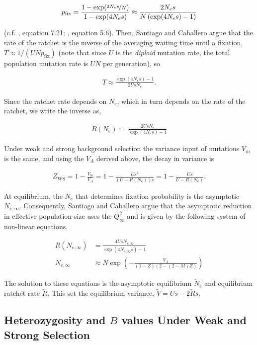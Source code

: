 \documentclass[11pt]{article}
\begin{document}
\begin{align}
  p_\text{fix} = \frac{1-\exp(\nicefrac{2 N_e s}{N})}{1-\exp(4 N_e s)} \approx
  \frac{2 N_e s}{N \left(\exp(4 N_e s)-1\right)}
\end{align}

(c.f. \cite{Durrett2008-ql}, equation 7.21; \cite{Kimura1957-rk}, equation
5.6). Then, Santiago and Caballero argue that the rate of the ratchet is the
inverse of the averaging waiting time until a fixation, $T \approx 1/(UN
p_\text{fix})$ (note that since $U$ is the \emph{diploid} mutation rate, the
total population mutation rate is $UN$ per generation), so

\begin{align}
  T \approx \frac{\exp(4 N_e s)-1}{2 U s N_e}.
\end{align}

Since the ratchet rate depends on $N_e$, which in turn depends on the rate of
the ratchet, we write the inverse as,

\begin{align}
  R(N_e) := \frac{2 U s N_e}{\exp(4 N_e s)-1}
\end{align}

Under weak and strong background selection the variance input of mutations
$V_m$ is the same, and using the $V_A$ derived above, the decay in variance is

\begin{align}
  Z_\text{WS} = 1 - \frac{V_m}{V_A} = 1 - \frac{Us^2}{(U-R(N_e))s} = 1 - \frac{Us}{U-R(N_e)}.
\end{align}

At equilibrium, the $N_e$ that determines fixation probability is the
asymptotic $N_{e,\infty}$. Consequently, Santiago and Caballero argue that the
asymptotic reduction in effective population size uses the $Q_\infty^2$ and is
given by the following system of non-linear equations,

\begin{align}
  R(N_{e,\infty}) &= \frac{4 U s N_{e,\infty}}{\exp(4 N_{e,\infty} s)-1}\\
  N_{e,\infty} &\approx N \exp\left(-\frac{V_A}{(1-Z) (2-(2-M) Z)} \right)
\end{align}

The solution to these equations is the asymptotic equilibrium $\widetilde{N}_e$ and
equilibrium ratchet rate $\widetilde{R}$. This set the equilibrium variance,
$\widetilde{V} = Us - 2\widetilde{R}s$.

\subsection*{Heterozygosity and $B$ values Under Weak and Strong Selection}
\end{document}
